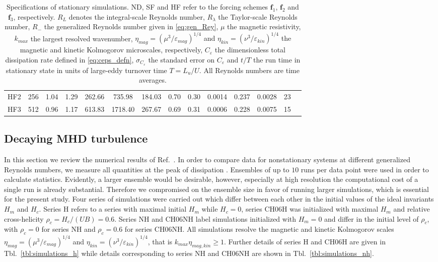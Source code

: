 \documentclass[aps,pre,onecolumn,superscriptaddress,notitlepage]{revtex4-1}
\newcommand{\Ceps}{C_\varepsilon}
\newcommand{\vep}{\varepsilon}
\renewcommand{\vec}[1]{\bm{#1}}
\newcommand{\blue}[1]{{#1}}
\begin{document}
\begin{table}[]
\begin{center}
\begin{tabular}{cccccccccccccc}
HF2 & 256 & 1.04 & 1.29 & 262.66 & 735.98 & 184.03 & 0.70& 0.30& 0.0014 & 0.237 & 0.0028 & 23 \\ %
HF3 & 512 & 0.96 & 1.17 & 613.83 &1718.40 & 267.67 & 0.69& 0.31& 0.0006  & 0.228 & 0.0075 & 15 \\ %
  \hline
  \end{tabular}
  \end{center}
 \caption{Specifications of stationary simulations. 
ND, SF and HF refer to the forcing schemes $\vec{f}_1$, $\vec{f}_2$ and $\vec{f}_3$, respectively. 
 $R_L$ denotes the integral-scale Reynolds number,
 $R_{\lambda}$ the Taylor-scale Reynolds number,
 $R_{-}$ the generalized Reynolds number given in \eqref{eq:gen_Rey}, $\mu$ the
 magnetic resistivity, 
 $k_{max}$ the largest resolved wavenumber, 
\blue{$\eta_{mag} = (\mu^3/\vep_{mag})^{1/4} $ and $\eta_{kin} = (\nu^3/\vep_{kin})^{1/4}$ the magnetic
and kinetic Kolmogorov microscales, respectively},
 $\Ceps$ the dimensionless total dissipation rate defined
 in \eqref{eq:ceps_defn}, $\sigma_{\Ceps}$ the
 standard error on $\Ceps$ and $t/T$ the run time in stationary state in
units of large-eddy turnover time $T=L_u/U$. All Reynolds numbers are time averages.
 }
 \label{tbl:simulations_forced}
 \end{table}

\subsection{Decaying MHD turbulence}
\label{sec:decay}
In this section we review the numerical results of Ref.~\cite{Linkmann15a}.
In order to compare data for nonstationary systems at different generalized Reynolds numbers,
we measure all quantities at the peak of dissipation \cite{Mininni09,Dallas13a}. Ensembles of up to 
$10$ runs per data point were used in order to calculate statistics. Evidently, a larger ensemble would 
be desirable, however, especially at high resolution the computational cost of a single run is already 
substantial. Therefore we compromised on the ensemble size in favor of running larger simulations, which is
essential for the present study. Four series of simulations were carried out which differ between 
each other in the initial values of the ideal invariants $H_m$ and $H_c$. Series H refers to 
a series with maximal initial $H_m$ while $H_c =0$, series CH06H was initialized with maximal $H_m$ and 
relative cross-helicity $\rho_c=H_c/(UB) =0.6$. Series NH and CH06NH label simulations initialized with $H_m=0$ and
differ in the initial level of $\rho_c$, with $\rho_c=0$ for series NH and $\rho_c=0.6$ for series CH06NH.   
All simulations resolve the magnetic and kinetic Kolmogorov scales
\blue{$\eta_{mag}=(\mu^3/\vep_{mag})^{1/4}$ and 
$\eta_{kin}= (\nu^3/\vep_{kin})^{1/4}$}, that is
$k_{max}\eta_{mag,kin} \geqslant 1$. 
Further details of series H and CH06H are given in Tbl.~\ref{tbl:simulations_h} while details corresponding to 
series NH and CH06NH are shown in Tbl.~\ref{tbl:simulations_nh}.  
\end{document}
